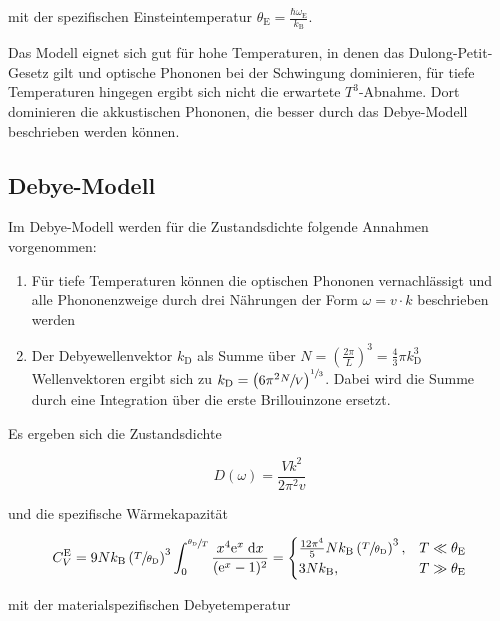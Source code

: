 mit der spezifischen Einsteintemperatur $\theta_\text{E} = \frac{\hbar\omega_\text{E}}{k_\text{B}}$.

Das Modell eignet sich gut für hohe Temperaturen, in denen das Dulong-Petit-Gesetz gilt und optische Phononen bei der Schwingung
dominieren, für tiefe Temperaturen hingegen ergibt sich nicht die erwartete $T^3$-Abnahme. Dort dominieren die akkustischen
Phononen, die besser durch das Debye-Modell beschrieben werden können.

\subsection{Debye-Modell}

Im Debye-Modell werden für die Zustandsdichte folgende Annahmen vorgenommen:

\begin{enumerate}
    \item Für tiefe Temperaturen können die optischen Phononen vernachlässigt und alle Phononenzweige durch drei Nährungen der Form $\omega = v \cdot k$ beschrieben werden
    \item Der Debyewellenvektor $k_\text{D}$ als Summe über $N = \left(\frac{2\pi}{L}\right)^3   = \frac{4}{3} \pi k_\text{D}^3$ Wellenvektoren ergibt sich zu $k_\text{D} = \left(6\pi^2\sfrac{N}{V}\right)^{\sfrac{1}{3}}$. Dabei wird die Summe durch eine Integration über die erste Brillouinzone ersetzt.
\end{enumerate}

Es ergeben sich die Zustandsdichte 

\begin{equation}
    D(\omega) = \frac{Vk^2}{2\pi^2v}
\end{equation}

und die spezifische Wärmekapazität

\begin{equation}
    C_V^\text{E} = 9Nk_\text{B} \left(\sfrac{T}{\theta_\text{D}}\right)^3 \int_0^{\sfrac{\theta_\text{D}}{T}} 
    \frac{x^4\text{e}^x \; \text{d}x}{(\text{e}^x - 1)^2} = 
    \begin{cases}
        \frac{12\pi^4}{5}Nk_\text{B}\left(\sfrac{T}{\theta_\text{D}}\right)^3, & T \ll \theta_\text{E} \\
        3Nk_\text{B} , & T \gg \theta_\text{E}
    \end{cases}
\end{equation}

mit der materialspezifischen Debyetemperatur 

